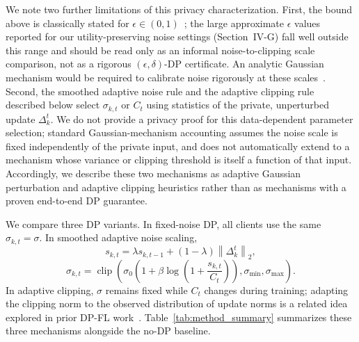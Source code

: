 \documentclass[conference]{IEEEtran}
\begin{document}
We note two further limitations of this privacy characterization. First, the
bound above is classically stated for \(\epsilon \in
(0,1)\)~\cite{dwork2006ourdata,dwork2014algorithmic}; the large approximate
\(\epsilon\) values reported for our utility-preserving noise settings
(Section~IV-G) fall well outside this range and should be read only as an
informal noise-to-clipping scale comparison, not as a rigorous
\((\epsilon,\delta)\)-DP certificate. An analytic Gaussian mechanism would be
required to calibrate noise rigorously at these scales~\cite{balle2018analytic}.
Second, the smoothed adaptive noise rule and the adaptive clipping rule
described below select \(\sigma_{k,t}\) or \(C_t\) using statistics of the
private, unperturbed update \(\Delta_k^t\). We do not provide a privacy proof
for this data-dependent parameter selection; standard Gaussian-mechanism
accounting assumes the noise scale is fixed independently of the private input,
and does not automatically extend to a mechanism whose variance or clipping
threshold is itself a function of that input. Accordingly, we describe these
two mechanisms as adaptive Gaussian perturbation and adaptive clipping
heuristics rather than as mechanisms with a proven end-to-end DP guarantee.

We compare three DP variants. In fixed-noise DP, all clients use the same
\(\sigma_{k,t}=\sigma\). In smoothed adaptive noise scaling,
\[
s_{k,t} = \lambda s_{k,t-1} + (1-\lambda)\left\lVert \Delta_k^t \right\rVert_2,
\]
\[
\sigma_{k,t} =
\operatorname{clip}\left(
\sigma_0
\left(
1 + \beta \log\left(1 + \frac{s_{k,t}}{C_t}\right)
\right),
\sigma_{\min},
\sigma_{\max}
\right).
\]
In adaptive clipping, \(\sigma\) remains fixed while \(C_t\) changes during
training; adapting the clipping norm to the observed distribution of update
norms is a related idea explored in prior DP-FL
work~\cite{andrew2021adaptive}. Table~\ref{tab:method_summary} summarizes these
three mechanisms alongside the no-DP baseline.
\end{document}
